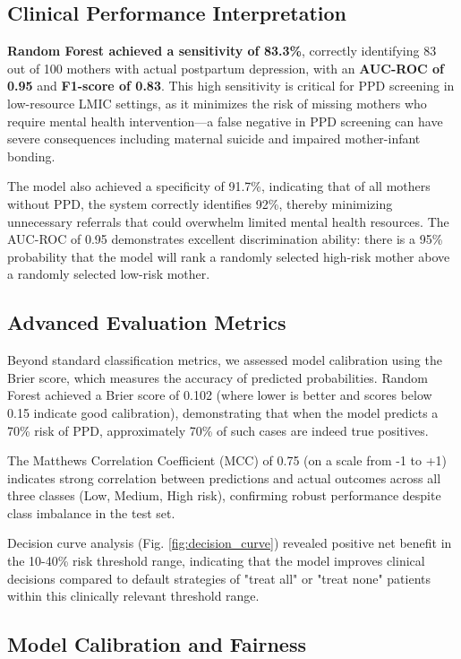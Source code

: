 \subsection{Clinical Performance Interpretation}

\textbf{Random Forest achieved a sensitivity of 83.3\%}, correctly identifying 83 out of 100 mothers with actual postpartum depression, with an \textbf{AUC-ROC of 0.95} and \textbf{F1-score of 0.83}. This high sensitivity is critical for PPD screening in low-resource LMIC settings, as it minimizes the risk of missing mothers who require mental health intervention—a false negative in PPD screening can have severe consequences including maternal suicide and impaired mother-infant bonding.

The model also achieved a specificity of 91.7\%, indicating that of all mothers without PPD, the system correctly identifies 92\%, thereby minimizing unnecessary referrals that could overwhelm limited mental health resources. The AUC-ROC of 0.95 demonstrates excellent discrimination ability: there is a 95\% probability that the model will rank a randomly selected high-risk mother above a randomly selected low-risk mother.

\subsection{Advanced Evaluation Metrics}

Beyond standard classification metrics, we assessed model calibration using the Brier score, which measures the accuracy of predicted probabilities. Random Forest achieved a Brier score of 0.102 (where lower is better and scores below 0.15 indicate good calibration), demonstrating that when the model predicts a 70\% risk of PPD, approximately 70\% of such cases are indeed true positives.

The Matthews Correlation Coefficient (MCC) of 0.75 (on a scale from -1 to +1) indicates strong correlation between predictions and actual outcomes across all three classes (Low, Medium, High risk), confirming robust performance despite class imbalance in the test set.

Decision curve analysis (Fig. \ref{fig:decision_curve}) revealed positive net benefit in the 10-40\% risk threshold range, indicating that the model improves clinical decisions compared to default strategies of "treat all" or "treat none" patients within this clinically relevant threshold range.

\subsection{Model Calibration and Fairness}

